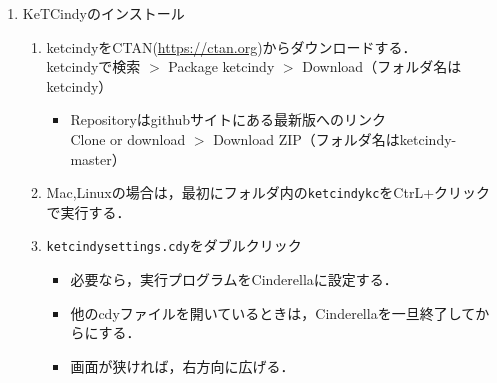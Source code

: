 \documentclass{ujarticle}
\begin{document}
\begin{enumerate}[\bf\large 1.]
\item KeTCindyのインストール\vspace{-2mm}
  \begin{enumerate}[(1)]
  \item ketcindyをCTAN(\url{https://ctan.org})からダウンロードする．\\
  \hspace*{10mm}ketcindyで検索 $>$ Package ketcindy $>$ Download（フォルダ名はketcindy）
    \begin{itemize}
    \item Repositoryはgithubサイトにある最新版へのリンク\\
        \hspace*{10mm}Clone or download $>$ Download ZIP（フォルダ名はketcindy-master）          
     \end{itemize}
  \item Mac,Linuxの場合は，最初にフォルダ内の\verb|ketcindykc|をCtrL+クリックで実行する．
  \item \verb|ketcindysettings.cdy|をダブルクリック
    \begin{itemize}
    \item 必要なら，実行プログラムをCinderellaに設定する．
    \item 他のcdyファイルを開いているときは，Cinderellaを一旦終了してからにする．
   \item 画面が狭ければ，右方向に広げる．
   \end{itemize}

\vspace{3mm}


\end{enumerate}
\end{enumerate}
\end{document}

